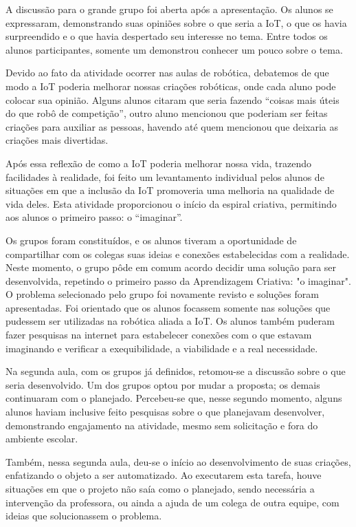 \documentclass[portuguese]{textolivre}
\begin{document}
A discussão para o grande grupo foi aberta após a apresentação. Os alunos se expressaram, demonstrando suas opiniões sobre o que seria a IoT, o que os havia surpreendido e o que havia despertado seu interesse no tema. Entre todos os alunos participantes, somente um demonstrou conhecer um pouco sobre o tema.

Devido ao fato da atividade ocorrer nas aulas de robótica, debatemos de que modo a IoT poderia melhorar nossas criações robóticas, onde cada aluno pode colocar sua opinião. Alguns alunos citaram que seria fazendo “coisas mais úteis do que robô de competição”, outro aluno mencionou que poderiam ser feitas criações para auxiliar as pessoas, havendo até quem mencionou que deixaria as criações mais divertidas.

Após essa reflexão de como a IoT poderia melhorar nossa vida, trazendo facilidades à realidade, foi feito um levantamento individual pelos alunos de situações em que a inclusão da IoT promoveria uma melhoria na qualidade de vida deles. Esta atividade proporcionou o início da espiral criativa, permitindo aos alunos o primeiro passo: o “imaginar”.

Os grupos foram constituídos, e os alunos tiveram a oportunidade de compartilhar com os colegas suas ideias e conexões estabelecidas com a realidade. Neste momento, o grupo pôde em comum acordo decidir uma solução para ser desenvolvida, repetindo o primeiro passo da Aprendizagem Criativa: "o imaginar". O problema selecionado pelo grupo foi novamente revisto e soluções foram apresentadas. Foi orientado que os alunos focassem somente nas soluções que pudessem ser utilizadas na robótica aliada a IoT. Os alunos também puderam fazer pesquisas na internet para estabelecer conexões com o que estavam imaginando e verificar a exequibilidade, a viabilidade e a real necessidade.

Na segunda aula, com os grupos já definidos, retomou-se a discussão sobre o que seria desenvolvido. Um dos grupos optou por mudar a proposta; os demais continuaram com o planejado. Percebeu-se que, nesse segundo momento, alguns alunos haviam inclusive feito pesquisas sobre o que planejavam desenvolver, demonstrando engajamento na atividade, mesmo sem solicitação e fora do ambiente escolar.

Também, nessa segunda aula, deu-se o início ao desenvolvimento de suas criações, enfatizando o objeto a ser automatizado. Ao executarem esta tarefa, houve situações em que o projeto não saía como o planejado, sendo necessária a intervenção da professora, ou ainda a ajuda de um colega de outra equipe, com ideias que solucionassem o problema.
\end{document}
